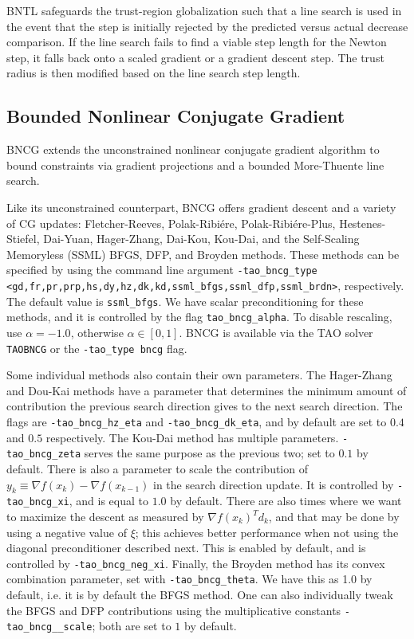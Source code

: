 \documentclass[]{book}
\begin{document}
BNTL safeguards the trust-region globalization such that a line search is used in the event that 
the step is initially rejected by the predicted versus actual decrease comparison. If the line 
search fails to find a viable step length for the Newton step, it falls back onto a scaled gradient 
or a gradient descent step. The trust radius is then modified based on the line search step length.

\subsection{Bounded Nonlinear Conjugate Gradient}
\label{sec:bncg}

BNCG extends the unconstrained nonlinear conjugate gradient algorithm to 
bound constraints via gradient projections and a bounded More-Thuente line search. 

Like its unconstrained counterpart, BNCG offers gradient descent and a variety of CG updates: 
Fletcher-Reeves, Polak-Ribi\'ere, Polak-Ribi\'ere-Plus, Hestenes-Stiefel, Dai-Yuan,
Hager-Zhang, Dai-Kou, Kou-Dai, and the Self-Scaling Memoryless (SSML) BFGS, DFP,
and Broyden methods.
These methods can be specified by using the command line argument 
{\tt -tao\_bncg\_type <gd,fr,pr,prp,hs,dy,hz,dk,kd,ssml\_bfgs,ssml\_dfp,ssml\_brdn>},
respectively. The default value is {\tt ssml\_bfgs}. We have scalar preconditioning for
these methods, and it is controlled by the flag {\tt tao\_bncg\_alpha}. To disable
rescaling, use $\alpha = -1.0$, otherwise $\alpha \in [0, 1]$.
BNCG is available via the TAO solver {\tt TAOBNCG} or the {\tt -tao\_type bncg} flag.

Some individual methods also contain their own parameters. The Hager-Zhang and Dou-Kai
 methods have a parameter that determines the minimum amount of contribution the previous
 search direction gives to the next search direction. The flags are
{\tt -tao\_bncg\_hz\_eta} and {\tt -tao\_bncg\_dk\_eta}, and by default are set to $0.4$ 
and $0.5$ respectively. The Kou-Dai method has multiple parameters.
{\tt -tao\_bncg\_zeta} serves the same purpose as the previous two; set to $0.1$ 
by default. There is also a parameter to scale the contribution of 
$y_k \equiv \nabla f(x_k) - \nabla f(x_{k-1}) $ in the search direction update. 
It is controlled by {\tt -tao\_bncg\_xi}, and is equal to $1.0$ by default. 
There are also times where we want to maximize the descent as measured 
by $\nabla f(x_k)^T d_k$, and that may be done by using a negative value of 
$\xi$; this achieves better performance when not using the diagonal preconditioner
described next. This is enabled by default, and is controlled by 
{\tt -tao\_bncg\_neg\_xi}. Finally, the Broyden method has its convex combination
parameter, set with {\tt -tao\_bncg\_theta}. We have this as 1.0 by 
default, i.e. it is by default the BFGS method. One can also individually 
tweak the BFGS and DFP contributions using the multiplicative constants 
{\tt -tao\_bncg\_<bfgs,dfp>\_scale}; both are set to $1$ by default.
\end{document}

